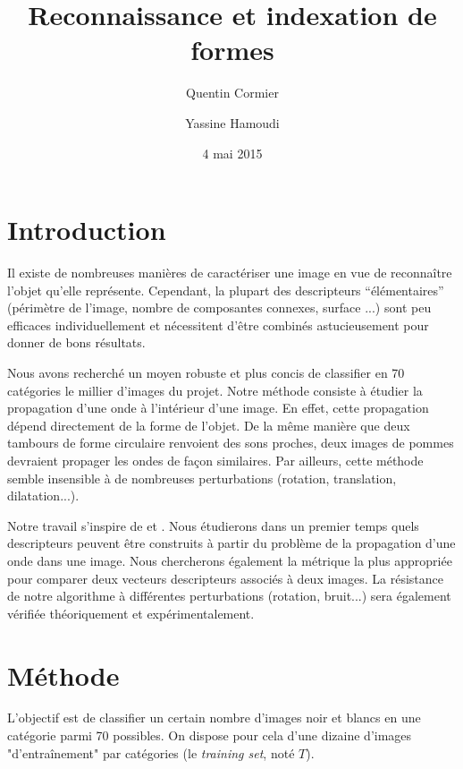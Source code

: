 \documentclass[a4paper,10pt]{article} %
\title{Reconnaissance et indexation de formes}
\author{Quentin Cormier \and Yassine Hamoudi}
\date{4 mai 2015}
\theoremstyle{definition} %
\begin{document}
\maketitle

\tableofcontents


\section{Introduction}

Il existe de nombreuses manières de caractériser une image en vue de reconnaître l'objet qu'elle représente. Cependant, la plupart des descripteurs ``élémentaires'' (périmètre de l'image, nombre de composantes connexes, surface ...) sont peu efficaces individuellement et nécessitent d'être combinés astucieusement pour donner de bons résultats.

Nous avons recherché un moyen robuste et plus concis de classifier en 70 catégories le millier d'images du projet. Notre méthode consiste à étudier la propagation d'une onde à l'intérieur d'une image. En effet, cette propagation dépend directement de la forme de l'objet. De la même manière que deux tambours de forme circulaire renvoient des sons proches, deux images de pommes devraient propager les ondes de façon similaires. Par ailleurs, cette méthode semble insensible à de nombreuses perturbations (rotation, translation, dilatation...).

Notre travail s'inspire de \cite{Zuliani04} et \cite{KhabouHR07}. Nous étudierons dans un premier temps quels descripteurs peuvent être construits à partir du problème de la propagation d'une onde dans une image. Nous chercherons également la métrique la plus appropriée pour comparer deux vecteurs descripteurs associés à deux images. La résistance de notre algorithme à différentes perturbations (rotation, bruit...) sera également vérifiée théoriquement et expérimentalement.

\section{Méthode}

L'objectif est de classifier un certain nombre d'images noir et blancs en une catégorie parmi 70 possibles.
On dispose pour cela d'une dizaine d'images "d'entraînement" par catégories (le \textit{training set}, noté $T$).
\end{document}
